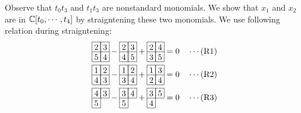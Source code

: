 Observe that \(t_0t_3\) and \(t_1t_3\) are nonstandard monomials. We show that \(x_1\) and \(x_2\) are in \(\mathbb{C}[t_0,\cdots,t_4]\) by straigntening these two monomials. We use following relation during straigntening:
\begin{align*}
\begin{array}[c]{*{2}c}\cline{1-2}
\lr{2}&\lr{3}\\\cline{1-2}
\lr{5}&\lr{4}\\\cline{1-2}
\end{array}
-\begin{array}[c]{*{2}c}\cline{1-2}
\lr{2}&\lr{3}\\\cline{1-2}
\lr{4}&\lr{5}\\\cline{1-2}
\end{array}
+\begin{array}[c]{*{2}c}\cline{1-2}
\lr{2}&\lr{4}\\\cline{1-2}
\lr{3}&\lr{5}\\\cline{1-2}
\end{array}
    &=0 && \cdots (\text{R1})\\
\begin{array}[c]{*{2}c}\cline{1-2}
\lr{1}&\lr{2}\\\cline{1-2}
\lr{4}&\lr{3}\\\cline{1-2}
\end{array}
-\begin{array}[c]{*{2}c}\cline{1-2}
\lr{1}&\lr{2}\\\cline{1-2}
\lr{3}&\lr{4}\\\cline{1-2}
\end{array}
+\begin{array}[c]{*{2}c}\cline{1-2}
\lr{1}&\lr{3}\\\cline{1-2}
\lr{2}&\lr{4}\\\cline{1-2}
\end{array}
    &=0 && \cdots (\text{R2})\\
\begin{array}[c]{*{2}c}\cline{1-2}
\lr{4}&\lr{3}\\\cline{1-2}
\lr{5}\\\cline{1-1}
\end{array}
-\begin{array}[c]{*{2}c}\cline{1-2}
\lr{3}&\lr{4}\\\cline{1-2}
\lr{5}\\\cline{1-1}
\end{array}
+\begin{array}[c]{*{2}c}\cline{1-2}
\lr{3}&\lr{5}\\\cline{1-2}
\lr{4}\\\cline{1-1}
\end{array}
    &=0 && \cdots (\text{R3})
\end{align*}

